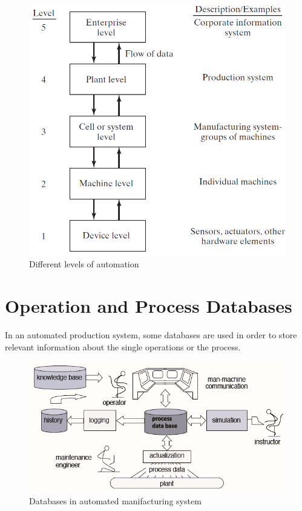 \begin{figure}
    \centering
    \includegraphics[scale=0.6]{img/automation_level.png}
    \caption{Different levels of automation}
\end{figure}

\section{Operation and Process Databases}
In an automated production system, some databases are used in order to store relevant information about the single operations or the process. 

\begin{figure}[h]
    \centering
    \includegraphics[scale=0.9]{img/Databases.png}
    \caption{Databases in automated manifacturing system}
    \label{fig:Databases}
\end{figure}

